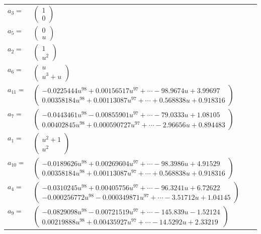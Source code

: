 \documentclass[1p]{elsarticle_modified}
\theoremstyle{definition}
\begin{document}
\begin{tabular}{m{7pt} m{180pt} m{7pt} m{180pt} }
\flushright $a_{3}=$&$\begin{pmatrix}1\\0\end{pmatrix}$ \\
\flushright $a_{5}=$&$\begin{pmatrix}0\\u\end{pmatrix}$ \\
\flushright $a_{2}=$&$\begin{pmatrix}1\\u^2\end{pmatrix}$ \\
\flushright $a_{6}=$&$\begin{pmatrix}u\\u^3+u\end{pmatrix}$ \\
\flushright $a_{11}=$&$\begin{pmatrix}-0.0225444 u^{98}+0.00156517 u^{97}+\cdots-98.9674 u+3.99697\\0.00358184 u^{98}+0.00113087 u^{97}+\cdots+0.568838 u+0.918316\end{pmatrix}$ \\
\flushright $a_{7}=$&$\begin{pmatrix}-0.0443461 u^{98}-0.00855901 u^{97}+\cdots-79.0333 u+1.08105\\0.00402845 u^{98}+0.000590727 u^{97}+\cdots-2.96656 u+0.894483\end{pmatrix}$ \\
\flushright $a_{1}=$&$\begin{pmatrix}u^2+1\\u^2\end{pmatrix}$ \\
\flushright $a_{10}=$&$\begin{pmatrix}-0.0189626 u^{98}+0.00269604 u^{97}+\cdots-98.3986 u+4.91529\\0.00358184 u^{98}+0.00113087 u^{97}+\cdots+0.568838 u+0.918316\end{pmatrix}$ \\
\flushright $a_{4}=$&$\begin{pmatrix}-0.0310245 u^{98}+0.00405756 u^{97}+\cdots-96.3241 u+6.72622\\-0.000256772 u^{98}-0.000349871 u^{97}+\cdots-3.51712 u+1.04145\end{pmatrix}$ \\
\flushright $a_{9}=$&$\begin{pmatrix}-0.0829098 u^{98}-0.00721519 u^{97}+\cdots-145.839 u-1.52124\\0.00219888 u^{98}+0.00435927 u^{97}+\cdots-14.5292 u+2.33219\end{pmatrix}$ \\

\end{tabular}
\end{document}
